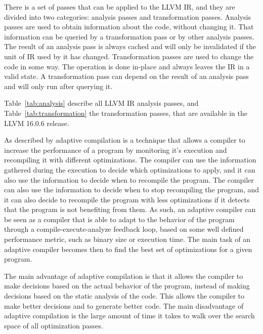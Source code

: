 There is a set of passes that can be applied to the LLVM IR, and they are divided into two categories: analysis
passes and transformation passes. Analysis passes are used to obtain information about the code, without changing it.
That information can be queried by a transformation pass or by other analysis passes. The result of an analysis pass is always cached
and will only be invalidated if the unit of IR used by it has changed.
Transformation passes are used to change the code in some way. The operation is done in-place and always leaves the IR in a valid state.
A transformation pass can depend on the result of an analysis pass and will only run after querying it.

Table~\ref{tab:analysis} describe all LLVM IR analysis passes, and Table~\ref{tab:transformation} the transformation passes, that are available in the LLVM 16.0.6 release.


As described by \citet{cooper2005acme} adaptive compilation is a technique that allows a compiler to increase the performance
of a program by monitoring it's execution and recompiling it with different optimizations. The compiler can use the information
gathered during the execution to decide which optimizations to apply, and it can also use the information to decide when to
recompile the program. The compiler can also use the information to decide when to stop recompiling the program, and it can
also decide to recompile the program with less optimizations if it detects that the program is not benefiting from them. As such,
an adaptive compiler can be seen as a compiler that is able to adapt to the behavior of the program through a compile-execute-analyze feedback loop,
based on some well defined performance metric, such as binary size or execution time. The main task of an adaptive compiler becomes then to find
the best set of optimizations for a given program.

The main advantage of adaptive compilation is that it allows the compiler to make decisions based on the actual behavior of the
program, instead of making decisions based on the static analysis of the code. This allows the compiler to make better decisions
and to generate better code. The main disadvantage of adaptive compilation is the large amount of time it takes to walk over the search space of
all optimization passes.



